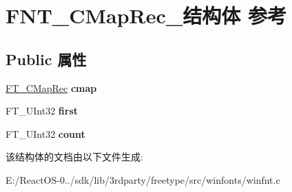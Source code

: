 \hypertarget{struct_f_n_t___c_map_rec__}{}\section{F\+N\+T\+\_\+\+C\+Map\+Rec\+\_\+结构体 参考}
\label{struct_f_n_t___c_map_rec__}
\subsection*{Public 属性}
\begin{DoxyCompactItemize}
\item 
\mbox{\label{struct_f_n_t___c_map_rec___a54c263f27a8b2a387d828231c2ea2462}} 
\hyperlink{struct_f_t___c_map_rec__}{F\+T\+\_\+\+C\+Map\+Rec} {\bfseries cmap}
\item 
\mbox{\label{struct_f_n_t___c_map_rec___a83bb61b113ab39676738bc1bdf5ae399}} 
F\+T\+\_\+\+U\+Int32 {\bfseries first}
\item 
\mbox{\label{struct_f_n_t___c_map_rec___a6154a287f1b85a0dcb01efe2131db7fd}} 
F\+T\+\_\+\+U\+Int32 {\bfseries count}
\end{DoxyCompactItemize}


该结构体的文档由以下文件生成\+:\begin{DoxyCompactItemize}
\item 
E\+:/\+React\+O\+S-\/0../sdk/lib/3rdparty/freetype/src/winfonts/winfnt.\+c\end{DoxyCompactItemize}
